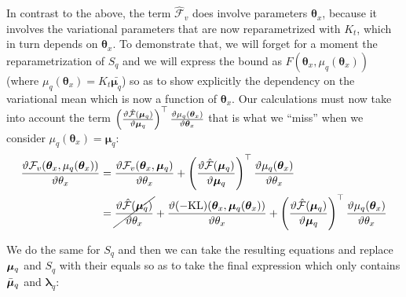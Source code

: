 In contrast to the above, the term $\hat{\mathcal{F}}_v$ does involve parameters $\boldsymbol \theta_x$, because it involves the variational parameters that are now reparametrized with $K_t$, which in turn depends on $\boldsymbol \theta_x$. 
To demonstrate that, we will forget for a moment the reparametrization of $S_q$ and we will express the bound as $F(\boldsymbol \theta_x, \mu_q (\boldsymbol \theta_x))$ (where $\mu_q (\boldsymbol \theta_x) = K_t \bar{\boldsymbol \mu_q}$) so as to show explicitly the dependency on the variational mean which is now a function of $\boldsymbol \theta_x$. Our calculations must now take into account the term
$
\left( \frac{\vartheta \hat{\mathcal{F}}(\boldsymbol \mu_q)}{\vartheta \boldsymbol \mu_q} \right)^{\top}
       \frac{\vartheta \mu_q (\boldsymbol \theta_x)}{\vartheta \boldsymbol \theta_x}
$
that is what we ``miss'' when we consider $\mu_q(\boldsymbol \theta_x) = \boldsymbol \mu_q$:
\begin{align}
\frac{\vartheta \mathcal{F}_v(\boldsymbol \theta_x, \mu_q(\boldsymbol \theta_x))}{\vartheta \theta_x} = {}&
	\frac{\vartheta \mathcal{F}_v(\boldsymbol \theta_x, \boldsymbol \mu_q)}{\vartheta \theta_x} 
  +  \left( \frac{\vartheta \hat{\mathcal{F}}(\boldsymbol \mu_q)}{\vartheta \boldsymbol \mu_q} \right)^{\top}
            \frac{\vartheta \mu_q(\boldsymbol \theta_x)}{\vartheta \theta_x} \nonumber \\
= {}&
 \cancel{
    \frac{\vartheta \hat{\mathcal{F}}(\boldsymbol \mu_q)}{\vartheta \theta_x}
  } +
  \frac{\vartheta (-\text{KL})(\boldsymbol \theta_x, \boldsymbol \mu_q(\boldsymbol \theta_x))}{\vartheta \theta_x}
+  \left( \frac{\vartheta \hat{\mathcal{F}}(\boldsymbol \mu_q)}{\vartheta \boldsymbol \mu_q} \right)^{\top}
            \frac{\vartheta \mu_q(\boldsymbol \theta_x)}{\vartheta \theta_x}
\label{meanReparamDerivFTheta}
\end{align}

We do the same for $S_q$ and then we can take the resulting equations and replace $\boldsymbol \mu_q$ and $S_q$ with their equals so as to take the final expression which only contains $\bar{\boldsymbol \mu}_q$ and $\boldsymbol \lambda_q$:

